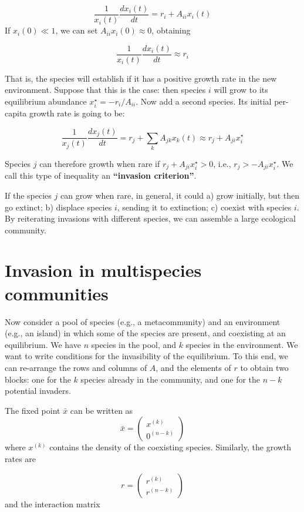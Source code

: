 \documentclass[
]{book}
\begin{document}
\[
\dfrac{1}{x_i(t)}\dfrac{dx_i(t)}{dt} = r_i + A_{ii} x_i(t)
\]
If \(x_i(0) \ll 1\), we can set \(A_{ii} x_i(0) \approx 0\), obtaining

\[
\dfrac{1}{x_i(t)}\dfrac{dx_i(t)}{dt} \approx r_i
\]

That is, the species will establish if it has a positive growth rate in the new environment. Suppose that this is the case: then species \(i\) will grow to its equilibrium abundance \(x_i^\star = -r_i / A_{ii}\). Now add a second species. Its initial per-capita growth rate is going to be:

\[
\dfrac{1}{x_j(t)}\dfrac{dx_j(t)}{dt} = r_j + \sum_k A_{jk} x_k(t) \approx r_j + A_{ji}x_i^\star
\]

Species \(j\) can therefore growth when rare if \(r_j + A_{ji}x_i^\star > 0\), i.e., \(r_j > -A_{ji}x_i^\star\). We call this type of inequality an \textbf{``invasion criterion''}.

If the species \(j\) can grow when rare, in general, it could a) grow initially, but then go extinct; b) displace species \(i\), sending it to extinction; c) coexist with species \(i\). By reiterating invasions with different species, we can assemble a large ecological community.

\hypertarget{invasion-in-multispecies-communities}{%
\section{Invasion in multispecies communities}\label{invasion-in-multispecies-communities}}

Now consider a pool of species (e.g., a metacommunity) and an environment (e.g., an island) in which some of the species are present, and coexisting at an equilibrium. We have \(n\) species in the pool, and \(k\) species in the environment. We want to write conditions for the invasibility of the equilibrium. To this end, we can re-arrange the rows and columns of \(A\), and the elements of \(r\) to obtain two blocks: one for the \(k\) species already in the community, and one for the \(n-k\) potential invaders.

The fixed point \(\bar{x}\) can be written as
\[
\bar{x} = \left(\begin{array}{l}
x^{(k)} \\
0^{(n-k)} 
\end{array} \right)
\]
where \(x^{(k)}\) contains the density of the coexisting species. Similarly, the growth rates are

\[
r = \left(\begin{array}{l}
r^{(k)} \\
r^{(n-k)} 
\end{array} \right)
\]
and the interaction matrix
\end{document}
